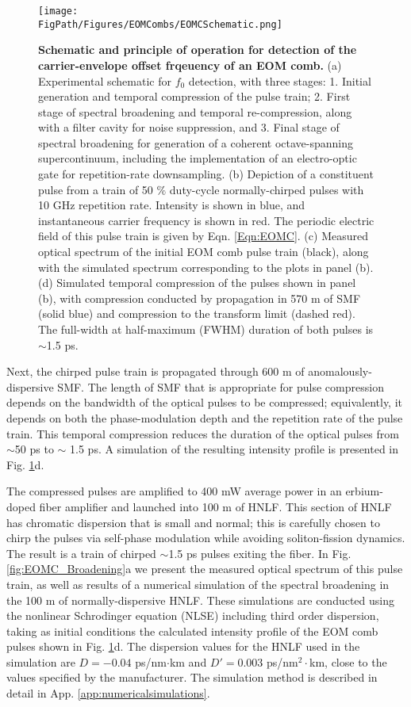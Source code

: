\begin{figure}[htpb]
	\begin{center}
		\texttt{[image: \\FigPath/Figures/EOMCombs/EOMCSchematic.png]}
	\end{center}
	\caption[Figure Title]{\textbf{Schematic and principle of operation for detection of the carrier-envelope offset frqeuency of an EOM comb.} (a) Experimental schematic for $f_0$ detection, with three stages: 1. Initial generation and temporal compression of the pulse train; 2. First stage of spectral broadening and temporal re-compression, along with a filter cavity for noise suppression, and 3. Final stage of spectral broadening for generation of a coherent octave-spanning supercontinuum, including the implementation of an electro-optic gate for repetition-rate downsampling. (b) Depiction of a constituent pulse from a train of 50 $\%$ duty-cycle normally-chirped pulses with 10 GHz repetition rate. Intensity is shown in blue, and instantaneous carrier frequency is shown in red. The periodic electric field of this pulse train is given by Eqn. \ref{Eqn:EOMC}. (c) Measured optical spectrum of the initial EOM comb pulse train (black), along with the simulated spectrum corresponding to the plots in panel (b). (d) Simulated temporal compression of the pulses shown in panel (b), with compression conducted by propagation in 570 m of SMF (solid blue) and compression to the transform limit (dashed red). The full-width at half-maximum (FWHM) duration of both pulses is $\sim$1.5 ps.   }
	\label{fig:EOMC_Schematic}
\end{figure} 


Next, the chirped pulse train is propagated through 600 m of anomalously-dispersive SMF. The length of SMF that is appropriate for pulse compression depends on the bandwidth of the optical pulses to be compressed; equivalently, it depends on both the phase-modulation depth and the repetition rate of the pulse train. This temporal compression reduces the duration of the optical pulses from $\sim$50 ps to $\sim$ 1.5 ps. A simulation of the resulting intensity profile is presented in Fig. \ref{fig:EOMC_Schematic}d. 

The compressed pulses are amplified to 400 mW average power in an erbium-doped fiber amplifier and launched into 100 m of HNLF. This section of HNLF has chromatic dispersion that is small and normal; this is carefully chosen to chirp the pulses via self-phase modulation while avoiding soliton-fission dynamics\cite{Dudley2006}. The result is a train of chirped $\sim$1.5 ps pulses exiting the fiber.  In Fig. \ref{fig:EOMC_Broadening}a we present the measured optical spectrum of this pulse train, as well as results of a numerical simulation of the spectral broadening in the 100 m of normally-dispersive HNLF. These simulations are conducted using the nonlinear Schrodinger equation (NLSE) including third order dispersion\cite{Agrawal2007}, taking as initial conditions the calculated intensity profile of the EOM comb pulses shown in Fig. \ref{fig:EOMC_Schematic}d. The dispersion values for the HNLF used in the simulation are $D=-0.04$  ps/nm$\cdot$km and $D'=0.003$ ps/nm$^2\cdot$km, close to the values specified by the manufacturer. The simulation method is described in detail in App. \ref{app:numericalsimulations}.

